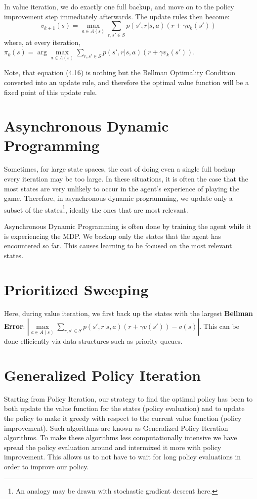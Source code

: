 \documentclass[12pt]{report}
\begin{document}
In value iteration, we do exactly one full backup, and move on to the policy improvement step immediately afterwards. The update rules then become:
\begin{equation}
    v_{k + 1}(s) = \max\limits_{a \in A(s)} \sum\limits_{r, s' \in S} p(s', r | s, a) (r + \gamma v_{k}(s'))
\end{equation}
where, at every iteration, $\pi_{k}(s) = \arg\max\limits_{a \in A(s)} \sum\limits_{r, s' \in S} p(s', r | s, a) (r + \gamma v_{k}(s'))$.

Note, that equation (4.16) is nothing but the Bellman Optimality Condition converted into an update rule, and therefore the optimal value function will be a fixed point of this update rule.
\section{Asynchronous Dynamic Programming}
Sometimes, for large state spaces, the cost of doing even a single full backup every iteration may be too large. In these situations, it is often the case that the most states are very unlikely to occur in the agent's experience of playing the game. 
Therefore, in asynchronous dynamic programming, we update only a subset of the states\footnote{An analogy may be drawn with stochastic gradient descent here.}, ideally the ones that are most relevant. 

Asynchronous Dynamic Programming is often done by training the agent while it is experiencing the MDP. We backup only the states that the agent has encountered so far. This causes learning to be focused on the most relevant states.

\section{Prioritized Sweeping}
Here, during value iteration, we first back up the states with the largest \textbf{Bellman Error}: $\left|\max\limits_{a \in A(s)}\sum\limits_{r, s' \in S} p(s', r | s, a)(r + \gamma v(s')) - v(s)\right|$. This can be done efficiently via data structures such as priority queues.

\section{Generalized Policy Iteration}
Starting from Policy Iteration, our strategy to find the optimal policy has been to both update the value function for the states (policy evaluation) and to update the policy to make it greedy with respect to the current value function (policy improvement). Such algorithms are known as 
Generalized Policy Iteration algorithms. To make these algorithms less computationally intensive we have spread the policy evaluation around and intermixed it more with policy improvement. This allows us to not have to wait for long policy evaluations in order to improve our policy.
\end{document}

